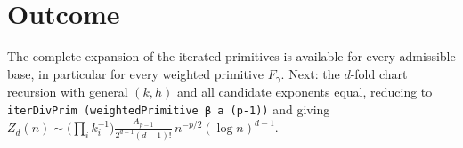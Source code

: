 \documentclass[11pt]{article}
\begin{document}
\section{Outcome}
The complete expansion of the iterated primitives is available for every admissible base, in particular
for every weighted primitive $F_\gamma$. Next: the $d$-fold chart recursion with general $(k,h)$ and all
candidate exponents equal, reducing to \texttt{iterDivPrim (weightedPrimitive β a (p-1))} and giving
$Z_d(n)\sim\big(\prod_ik_i^{-1}\big)\frac{A_{p-1}}{2^{d-1}(d-1)!}\,n^{-p/2}(\log n)^{d-1}$.
\end{document}

